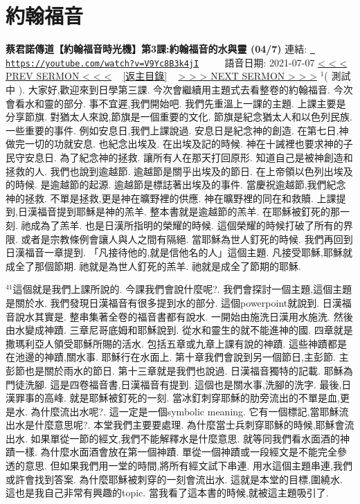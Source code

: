 \documentclass{book}
\begin{document}
\section{約翰福音}
\label{sec:V9Yc8B3k4jI}
\textbf{蔡君諾傳道【約翰福音時光機】第3課:約翰福音的水與靈 (04/7)}
\newline
\newline
連結: \href{https://youtube.com/watch?v=V9Yc8B3k4jI}{\texttt{ https://youtube.com/watch?v=V9Yc8B3k4jI}} ~~~~ 語音日期: 2021-07-07 
\newline
\newline
\hyperref[sec:dO8lwORzvRQ]{\small{< < < PREV SERMON < < <}}
~
\hyperref[sec:index]{\small{[返主目錄]}}
~
\hyperref[sec:k_cCh3J_U2w]{\small{> > > NEXT SERMON > > >}}
\newline
\newline
$^{1}$( 測試中 ).
大家好,歡迎來到日學第三課.
今次會繼續用主題式去看整卷的約翰福音.
今次會看水和靈的部分.
事不宜遲,我們開始吧.
我們先重溫上一課的主題.
上課主要是分享節旗.
對猶太人來說,節旗是一個重要的文化.
節旗是紀念猶太人和以色列民族.
一些重要的事件.
例如安息日,我們上課說過.
安息日是紀念神的創造.
在第七日,神做完一切的功就安息.
也紀念出埃及.
在出埃及記的時候.
神在十誡裡也要求神的子民守安息日.
為了紀念神的拯救.
讓所有人在那天打回原形.
知道自己是被神創造和拯救的人.
我們也說到逾越節.
逾越節是關乎出埃及的節日.
在上帝領以色列出埃及的時候.
是逾越節的起源.
逾越節是標誌著出埃及的事件.
當慶祝逾越節,我們紀念神的拯救.
不單是拯救,更是神在曠野裡的供應.
神在曠野裡的同在和救贖.
上課提到,日漢福音提到耶穌是神的羔羊.
整本書就是逾越節的羔羊.
在耶穌被釘死的那一刻.
祂成為了羔羊.
也是日漢所指明的榮耀的時候.
這個榮耀的時候打破了所有的界限.
或者是宗教條例會讓人與人之間有隔絕.
當耶穌為世人釘死的時候.
我們再回到日漢福音一章提到.
「凡接待他的,就是信他名的人」這個主題.
凡接受耶穌,耶穌就成全了那個節期.
祂就是為世人釘死的羔羊.
祂就是成全了節期的耶穌.

$^{41}$這個就是我們上課所說的.
今課我們會說什麼呢?.
我們會探討一個主題,這個主題是關於水.
我們發現日漢福音有很多提到水的部分.
這個powerpoint就說到.
日漢福音說水其實是.
整串集著全卷的福音書都有說水.
一開始由施洗日漢用水施洗.
然後由水變成神蹟.
三章尼哥底姆和耶穌說到.
從水和靈生的就不能進神的國.
四章就是撒瑪利亞人領受耶穌所賜的活水.
包括五章或九章上課有說的神蹟.
這些神蹟都是在池邊的神蹟,關水事.
耶穌行在水面上.
第十章我們會說到另一個節日,主彭節.
主彭節也是關於雨水的節日.
第十三章就是我們也說過.
日漢福音獨特的記載.
耶穌為門徒洗腳.
這是四卷福音書,日漢福音有提到.
這個也是關水事,洗腳的洗字.
最後,日漢罪事的高峰.
就是耶穌被釘死的一刻.
當冰釘刺穿耶穌的肋旁流出的不單是血,更是水.
為什麼流出水呢?.
這一定是一個symbolic meaning.
它有一個標記,當耶穌流出水是什麼意思呢?.
本堂我們主要要處理.
為什麼當士兵刺穿耶穌的時候,耶穌會流出水.
如果單從一節的經文,我們不能解釋水是什麼意思.
就等同我們看水面酒的神蹟一樣.
為什麼水面酒會放在第一個神蹟.
單從一個神蹟或一段經文是不能完全參透的意思.
但如果我們用一堂的時間,將所有經文試下串連.
用水這個主題串連,我們或許會找到答案.
為什麼耶穌被刺穿的一刻會流出水.
這就是本堂的目標,圍繞水.
這也是我自己非常有興趣的topic.
當我看了這本書的時候,就被這主題吸引了.
\end{document}
